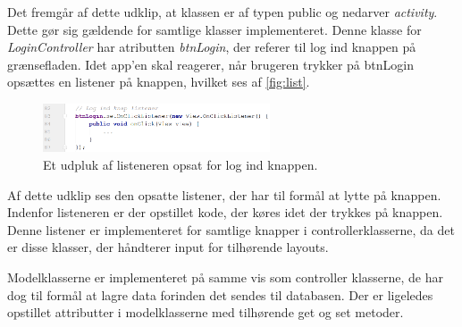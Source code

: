 Det fremgår af dette udklip, at klassen er af typen public og nedarver \textit{activity}. Dette gør sig gældende for samtlige klasser implementeret. Denne klasse for \textit{LoginController} har atributten \textit{btnLogin}, der referer til log ind knappen på grænsefladen. Idet app'en skal reagerer, når brugeren trykker på btnLogin opsættes en listener på knappen, hvilket ses af \autoref{fig:list}.

\begin{figure} [H]
\centering
\includegraphics[width=0.6\textwidth]{figures/imple/list}
\caption{Et udpluk af listeneren opsat for log ind knappen.}
\label{fig:list}
\end{figure}

Af dette udklip ses den opsatte listener, der har til formål at lytte på knappen. Indenfor listeneren er der opstillet kode, der køres idet der trykkes på knappen. Denne listener er implementeret for samtlige knapper i controllerklasserne, da det er disse klasser, der håndterer input for tilhørende layouts. 

Modelklasserne er implementeret på samme vis som controller klasserne, de har dog til formål at lagre data forinden det sendes til databasen. Der er ligeledes opstillet attributter i modelklasserne med tilhørende get og set metoder. 

